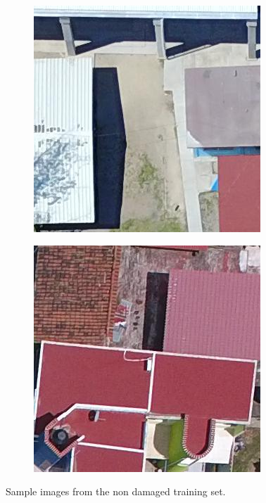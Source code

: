 \begin{figure}[!h]
\begin{subfigure}{.24\textwidth}
    \end{subfigure}
    \begin{subfigure}{.24\textwidth}
        \includegraphics[width=\textwidth]{images/nondamaged7.jpg}
    \end{subfigure}
    \begin{subfigure}{.24\textwidth}
        \includegraphics[width=\textwidth]{images/nondamaged8.jpg}
    \end{subfigure}
  \caption{Sample images from the non damaged training set.}
  \label{fig:nondamaged}
\end{figure}

